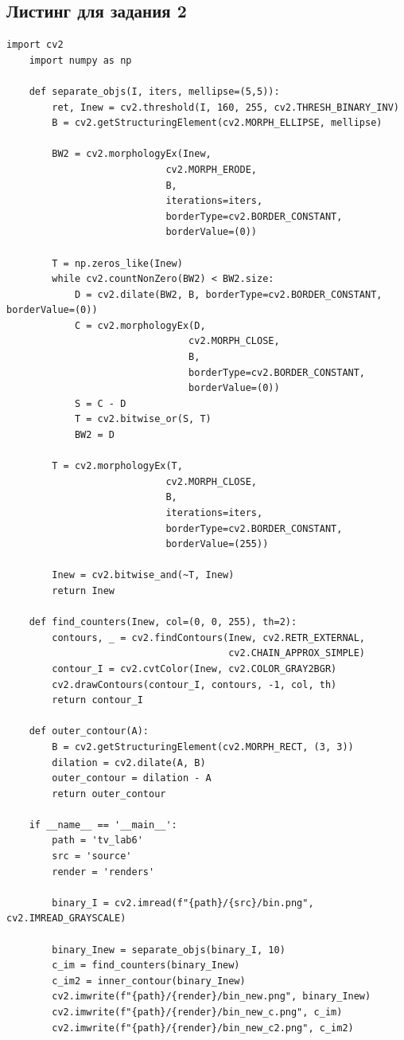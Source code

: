 \documentclass[a4paper, 12pt]{article}
\begin{document}
    \subsection{Листинг для задания 2}
    \begin{lstlisting}[label=task2, caption=Программа для разделения <<склеенных>> объектов]
    import cv2
    import numpy as np

    def separate_objs(I, iters, mellipse=(5,5)):
        ret, Inew = cv2.threshold(I, 160, 255, cv2.THRESH_BINARY_INV)
        B = cv2.getStructuringElement(cv2.MORPH_ELLIPSE, mellipse)

        BW2 = cv2.morphologyEx(Inew,
                            cv2.MORPH_ERODE,
                            B,
                            iterations=iters,
                            borderType=cv2.BORDER_CONSTANT,
                            borderValue=(0))

        T = np.zeros_like(Inew)
        while cv2.countNonZero(BW2) < BW2.size:
            D = cv2.dilate(BW2, B, borderType=cv2.BORDER_CONSTANT, borderValue=(0))
            C = cv2.morphologyEx(D,
                                cv2.MORPH_CLOSE,
                                B,
                                borderType=cv2.BORDER_CONSTANT,
                                borderValue=(0))
            S = C - D
            T = cv2.bitwise_or(S, T)
            BW2 = D

        T = cv2.morphologyEx(T,
                            cv2.MORPH_CLOSE,
                            B,
                            iterations=iters,
                            borderType=cv2.BORDER_CONSTANT,
                            borderValue=(255))

        Inew = cv2.bitwise_and(~T, Inew)
        return Inew

    def find_counters(Inew, col=(0, 0, 255), th=2):
        contours, _ = cv2.findContours(Inew, cv2.RETR_EXTERNAL,
                                       cv2.CHAIN_APPROX_SIMPLE)
        contour_I = cv2.cvtColor(Inew, cv2.COLOR_GRAY2BGR)
        cv2.drawContours(contour_I, contours, -1, col, th)
        return contour_I

    def outer_contour(A):
        B = cv2.getStructuringElement(cv2.MORPH_RECT, (3, 3))
        dilation = cv2.dilate(A, B)
        outer_contour = dilation - A
        return outer_contour

    if __name__ == '__main__':
        path = 'tv_lab6'
        src = 'source'
        render = 'renders'
        
        binary_I = cv2.imread(f"{path}/{src}/bin.png", cv2.IMREAD_GRAYSCALE)
    
        binary_Inew = separate_objs(binary_I, 10)
        c_im = find_counters(binary_Inew)
        c_im2 = inner_contour(binary_Inew)
        cv2.imwrite(f"{path}/{render}/bin_new.png", binary_Inew)
        cv2.imwrite(f"{path}/{render}/bin_new_c.png", c_im)
        cv2.imwrite(f"{path}/{render}/bin_new_c2.png", c_im2)
    \end{lstlisting}
\end{document}
